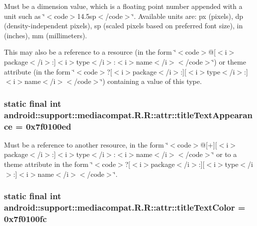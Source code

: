 Must be a dimension value, which is a floating point number appended with a unit such as \char`\"{}$<$code$>$14.5sp$<$/code$>$\char`\"{}. Available units are: px (pixels), dp (density-independent pixels), sp (scaled pixels based on preferred font size), in (inches), mm (millimeters). 

This may also be a reference to a resource (in the form \char`\"{}$<$code$>$@\mbox{[}$<$i$>$package$<$/i$>$:\mbox{]}$<$i$>$type$<$/i$>$:$<$i$>$name$<$/i$>$$<$/code$>$\char`\"{}) or theme attribute (in the form \char`\"{}$<$code$>$?\mbox{[}$<$i$>$package$<$/i$>$:\mbox{]}\mbox{[}$<$i$>$type$<$/i$>$:\mbox{]}$<$i$>$name$<$/i$>$$<$/code$>$\char`\"{}) containing a value of this type. \hypertarget{classandroid_1_1support_1_1mediacompat_1_1_r_1_1attr_4c9b2eafed2e6aaec15f7f474be398fe}{
\subsubsection[{titleTextAppearance}]{\setlength{\rightskip}{0pt plus 5cm}static final int android::support::mediacompat.R.R::attr::titleTextAppearance = 0x7f0100ed}}
\label{classandroid_1_1support_1_1mediacompat_1_1_r_1_1attr_4c9b2eafed2e6aaec15f7f474be398fe}


Must be a reference to another resource, in the form \char`\"{}$<$code$>$@\mbox{[}+\mbox{]}\mbox{[}$<$i$>$package$<$/i$>$:\mbox{]}$<$i$>$type$<$/i$>$:$<$i$>$name$<$/i$>$$<$/code$>$\char`\"{} or to a theme attribute in the form \char`\"{}$<$code$>$?\mbox{[}$<$i$>$package$<$/i$>$:\mbox{]}\mbox{[}$<$i$>$type$<$/i$>$:\mbox{]}$<$i$>$name$<$/i$>$$<$/code$>$\char`\"{}. \hypertarget{classandroid_1_1support_1_1mediacompat_1_1_r_1_1attr_d023641d62a5889ed9303e04a319b545}{
\subsubsection[{titleTextColor}]{\setlength{\rightskip}{0pt plus 5cm}static final int android::support::mediacompat.R.R::attr::titleTextColor = 0x7f0100fc}}
\label{classandroid_1_1support_1_1mediacompat_1_1_r_1_1attr_d023641d62a5889ed9303e04a319b545}


